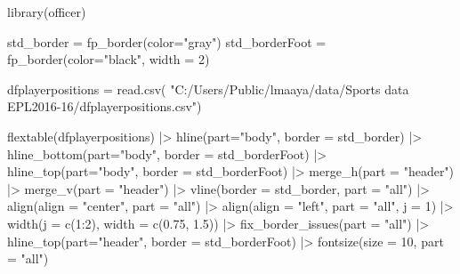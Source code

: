 \documentclass[
  letterpaper,
  DIV=11,
  numbers=noendperiod]{scrartcl}
\newenvironment{Shaded}{\begin{snugshade}}{\end{snugshade}}
\newcommand{\AttributeTok}[1]{\textcolor[rgb]{0.40,0.45,0.13}{#1}}
\newcommand{\DecValTok}[1]{\textcolor[rgb]{0.68,0.00,0.00}{#1}}
\newcommand{\FloatTok}[1]{\textcolor[rgb]{0.68,0.00,0.00}{#1}}
\newcommand{\FunctionTok}[1]{\textcolor[rgb]{0.28,0.35,0.67}{#1}}
\newcommand{\NormalTok}[1]{\textcolor[rgb]{0.00,0.23,0.31}{#1}}
\newcommand{\OtherTok}[1]{\textcolor[rgb]{0.00,0.23,0.31}{#1}}
\newcommand{\SpecialCharTok}[1]{\textcolor[rgb]{0.37,0.37,0.37}{#1}}
\newcommand{\StringTok}[1]{\textcolor[rgb]{0.13,0.47,0.30}{#1}}
\begin{document}
\begin{Shaded}
\begin{Highlighting}[]
\FunctionTok{library}\NormalTok{(officer)}

\NormalTok{std\_border }\OtherTok{=} \FunctionTok{fp\_border}\NormalTok{(}\AttributeTok{color=}\StringTok{"gray"}\NormalTok{)}
\NormalTok{std\_borderFoot }\OtherTok{=} \FunctionTok{fp\_border}\NormalTok{(}\AttributeTok{color=}\StringTok{"black"}\NormalTok{, }\AttributeTok{width =} \DecValTok{2}\NormalTok{)}

\NormalTok{dfplayerpositions }\OtherTok{=} \FunctionTok{read.csv}\NormalTok{(}
  \StringTok{"C:/Users/Public/lmaaya/data/Sports data EPL2016{-}16/dfplayerpositions.csv"}\NormalTok{)}

\FunctionTok{flextable}\NormalTok{(dfplayerpositions) }\SpecialCharTok{|\textgreater{}} 
  \FunctionTok{hline}\NormalTok{(}\AttributeTok{part=}\StringTok{"body"}\NormalTok{, }\AttributeTok{border =}\NormalTok{ std\_border) }\SpecialCharTok{|\textgreater{}} 
  \FunctionTok{hline\_bottom}\NormalTok{(}\AttributeTok{part=}\StringTok{"body"}\NormalTok{, }\AttributeTok{border =}\NormalTok{ std\_borderFoot) }\SpecialCharTok{|\textgreater{}} 
  \FunctionTok{hline\_top}\NormalTok{(}\AttributeTok{part=}\StringTok{"body"}\NormalTok{, }\AttributeTok{border =}\NormalTok{ std\_borderFoot) }\SpecialCharTok{|\textgreater{}} 
  \FunctionTok{merge\_h}\NormalTok{(}\AttributeTok{part =} \StringTok{"header"}\NormalTok{) }\SpecialCharTok{|\textgreater{}} \FunctionTok{merge\_v}\NormalTok{(}\AttributeTok{part =} \StringTok{"header"}\NormalTok{) }\SpecialCharTok{|\textgreater{}} 
  \FunctionTok{vline}\NormalTok{(}\AttributeTok{border =}\NormalTok{ std\_border, }\AttributeTok{part =} \StringTok{"all"}\NormalTok{) }\SpecialCharTok{|\textgreater{}} \FunctionTok{align}\NormalTok{(}\AttributeTok{align =} \StringTok{"center"}\NormalTok{, }\AttributeTok{part =} \StringTok{"all"}\NormalTok{) }\SpecialCharTok{|\textgreater{}} 
  \FunctionTok{align}\NormalTok{(}\AttributeTok{align =} \StringTok{"left"}\NormalTok{, }\AttributeTok{part =} \StringTok{"all"}\NormalTok{, }\AttributeTok{j =} \DecValTok{1}\NormalTok{) }\SpecialCharTok{|\textgreater{}} \FunctionTok{width}\NormalTok{(}\AttributeTok{j =} \FunctionTok{c}\NormalTok{(}\DecValTok{1}\SpecialCharTok{:}\DecValTok{2}\NormalTok{), }\AttributeTok{width =} \FunctionTok{c}\NormalTok{(}\FloatTok{0.75}\NormalTok{, }\FloatTok{1.5}\NormalTok{)) }\SpecialCharTok{|\textgreater{}}
  \FunctionTok{fix\_border\_issues}\NormalTok{(}\AttributeTok{part =} \StringTok{"all"}\NormalTok{) }\SpecialCharTok{|\textgreater{}} \FunctionTok{hline\_top}\NormalTok{(}\AttributeTok{part=}\StringTok{"header"}\NormalTok{, }\AttributeTok{border =}\NormalTok{ std\_borderFoot) }\SpecialCharTok{|\textgreater{}} 
  \FunctionTok{fontsize}\NormalTok{(}\AttributeTok{size =} \DecValTok{10}\NormalTok{, }\AttributeTok{part =} \StringTok{"all"}\NormalTok{)}
\end{Highlighting}
\end{Shaded}
\end{document}
